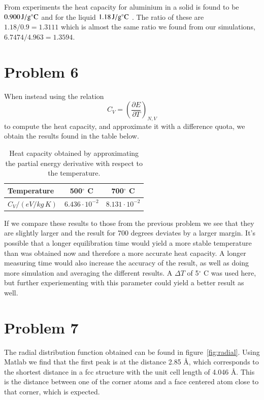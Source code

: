 From experiments the heat capacity for aluminium in a solid is found to be $\unit[0.900]{J/g^\circ C}$ \cite{al_heat_solid} and for the liquid $\unit[1.18]{J/g^\circ C}$ \cite{al_heat_liquid}. The ratio of these are $1.18/0.9=1.3111$ which is almost the same ratio we found from our simulations,
$6.7474/4.963=1.3594$.



\section*{Problem 6}

When instead using the relation
\begin{equation}
	C_V = \left( \frac{\partial E}{\partial T} \right)_{N,V}
\end{equation}
to compute the heat capacity, and approximate it with a difference quota, we obtain the results found in the table below.

\begin{table}[h!]
	\centering	
	\caption{Heat capacity obtained by approximating the partial energy derivative with respect to the temperature.}
	\begin{tabular}{l|cc}
		\hline \textbf{Temperature} & \textbf{500$^\circ$ C} & \textbf{700$^\circ$ C} \\ \hline
		$C_V / (\unit{eV/kg\,K})$ & $6.436 \cdot 10^{-2}$ & $8.131 \cdot 10^{-2}$ \\ \hline
	\end{tabular}
	\label{tab:prob6}
\end{table}

If we compare these results to those from the previous problem we see that they are slightly larger and the result for 700 degrees deviates by a larger margin. It's possible that a longer equilibration time would yield a more stable temperature than was obtained now and therefore a more accurate heat capacity. A longer measuring time would also increase the accuracy of the result, as well as doing more simulation and averaging the different results. A $\Delta T$ of 5$^\circ$ C was used here, but further experiementing with this parameter could yield a better result as well.

\section*{Problem 7}

The radial distribution function obtained can be found in figure~\ref{fig:radial}. Using Matlab we find that the first peak is at the distance 2.85 \r{A}, which corresponds to the shortest distance in a fcc structure with the unit cell length of 4.046 \r{A}. This is the distance between one of the corner atoms and a face centered atom close to that corner, which is expected.

